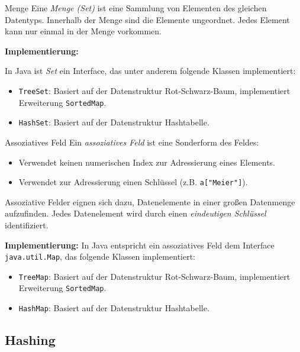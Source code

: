 \documentclass[german]{../spicker}
\begin{document}
\begin{defi}{Menge}
    Eine \emph{Menge (Set)} ist eine Sammlung von Elementen des gleichen Datentyps.
    Innerhalb der Menge sind die Elemente ungeordnet.
    Jedes Element kann nur einmal in der Menge vorkommen.

    \textbf{Implementierung:}

    In Java ist \emph{Set} ein Interface, das unter anderem folgende Klassen implementiert:
    \begin{itemize}
        \item \texttt{TreeSet}: Basiert auf der Datenstruktur Rot-Schwarz-Baum, implementiert Erweiterung \texttt{SortedMap}.
        \item \texttt{HashSet}: Basiert auf der Datenstruktur Hashtabelle.
    \end{itemize}
\end{defi}

\begin{defi}{Assoziatives Feld}
    Ein \emph{assoziatives Feld} ist eine Sonderform des Feldes:
    \begin{itemize}
        \item Verwendet keinen numerischen Index zur Adressierung eines Elements.
        \item Verwendet zur Adressierung einen Schlüssel (z.B. \texttt{a["Meier"]}).
    \end{itemize}

    Assoziative Felder eignen sich dazu, Datenelemente in einer großen Datenmenge aufzufinden.
    Jedes Datenelement wird durch einen \emph{eindeutigen Schlüssel} identifiziert.

    \textbf{Implementierung:}
    In Java entspricht ein assoziatives Feld dem Interface \texttt{java.util.Map}, das folgende Klassen implementiert:
    \begin{itemize}
        \item \texttt{TreeMap}: Basiert auf der Datenstruktur Rot-Schwarz-Baum, implementiert Erweiterung \texttt{SortedMap}.
        \item \texttt{HashMap}: Basiert auf der Datenstruktur Hashtabelle.
    \end{itemize}
\end{defi}



\subsection{Hashing}
\end{document}
